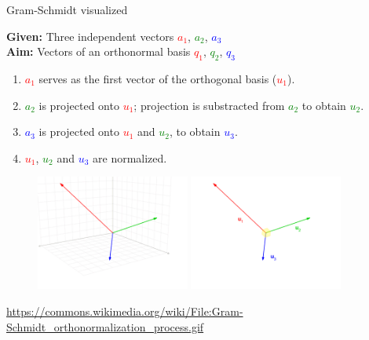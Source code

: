 \documentclass[11pt,compress,t,notes=noshow, xcolor=table]{beamer}
\begin{document}
\begin{vbframe}{Gram-Schmidt visualized}
\framebreak

\begin{scriptsize}

\textbf{Given:} Three independent vectors \textcolor{red}{$a_1$}, \textcolor{green}{$a_2$}, \textcolor{blue}{$a_3$} \\
\textbf{Aim:} Vectors of an orthonormal basis \textcolor{red}{$q_1$}, \textcolor{green}{$q_2$}, \textcolor{blue}{$q_3$}

\begin{enumerate}
  \item<2-> \textcolor{red}{$a_1$} serves as the first vector of the orthogonal basis (\textcolor{red}{$u_1$}).
  \item<3-> \textcolor{green}{$a_2$} is projected onto \textcolor{red}{$u_1$}; projection is substracted from \textcolor{green}{$a_2$}
        to obtain \textcolor{green}{$u_2$}.
  \item<4-> \textcolor{blue}{$a_3$} is projected onto \textcolor{red}{$u_1$} and \textcolor{green}{$u_2$},
        to obtain \textcolor{blue}{$u_3$}.
  \item \textcolor{red}{$u_1$}, \textcolor{green}{$u_2$} and \textcolor{blue}{$u_3$} are normalized.
\end{enumerate}

\end{scriptsize}

\begin{figure}
  \centering
  \includegraphics[width=0.45\textwidth]{figure_man/frame_131_delay-2s.png}
  \includegraphics[width=0.45\textwidth]{figure_man/frame_134_delay-3s.png}
\end{figure}
\tiny{\url{https://commons.wikimedia.org/wiki/File:Gram-Schmidt_orthonormalization_process.gif}}


\end{vbframe}
\end{document}
